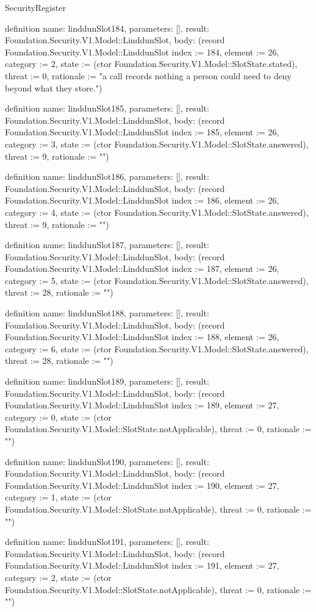\begin{lexlean}{SecurityRegister}
\begin{semanticmodule}
definition{
  name: linddunSlot184,
  parameters: [],
  result: Foundation.Security.V1.Model::LinddunSlot,
  body: (record Foundation.Security.V1.Model::LinddunSlot {index := 184, element := 26, category := 2, state := (ctor Foundation.Security.V1.Model::SlotState.stated), threat := 0, rationale := "a call records nothing a person could need to deny beyond what they store."})
}

definition{
  name: linddunSlot185,
  parameters: [],
  result: Foundation.Security.V1.Model::LinddunSlot,
  body: (record Foundation.Security.V1.Model::LinddunSlot {index := 185, element := 26, category := 3, state := (ctor Foundation.Security.V1.Model::SlotState.answered), threat := 9, rationale := ""})
}

definition{
  name: linddunSlot186,
  parameters: [],
  result: Foundation.Security.V1.Model::LinddunSlot,
  body: (record Foundation.Security.V1.Model::LinddunSlot {index := 186, element := 26, category := 4, state := (ctor Foundation.Security.V1.Model::SlotState.answered), threat := 9, rationale := ""})
}

definition{
  name: linddunSlot187,
  parameters: [],
  result: Foundation.Security.V1.Model::LinddunSlot,
  body: (record Foundation.Security.V1.Model::LinddunSlot {index := 187, element := 26, category := 5, state := (ctor Foundation.Security.V1.Model::SlotState.answered), threat := 28, rationale := ""})
}

definition{
  name: linddunSlot188,
  parameters: [],
  result: Foundation.Security.V1.Model::LinddunSlot,
  body: (record Foundation.Security.V1.Model::LinddunSlot {index := 188, element := 26, category := 6, state := (ctor Foundation.Security.V1.Model::SlotState.answered), threat := 28, rationale := ""})
}

definition{
  name: linddunSlot189,
  parameters: [],
  result: Foundation.Security.V1.Model::LinddunSlot,
  body: (record Foundation.Security.V1.Model::LinddunSlot {index := 189, element := 27, category := 0, state := (ctor Foundation.Security.V1.Model::SlotState.notApplicable), threat := 0, rationale := ""})
}

definition{
  name: linddunSlot190,
  parameters: [],
  result: Foundation.Security.V1.Model::LinddunSlot,
  body: (record Foundation.Security.V1.Model::LinddunSlot {index := 190, element := 27, category := 1, state := (ctor Foundation.Security.V1.Model::SlotState.notApplicable), threat := 0, rationale := ""})
}

definition{
  name: linddunSlot191,
  parameters: [],
  result: Foundation.Security.V1.Model::LinddunSlot,
  body: (record Foundation.Security.V1.Model::LinddunSlot {index := 191, element := 27, category := 2, state := (ctor Foundation.Security.V1.Model::SlotState.notApplicable), threat := 0, rationale := ""})
}


\end{semanticmodule}
\end{lexlean}
